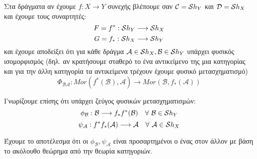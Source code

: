 \vspace*{0.3cm}
\noindent Στα δράγματα αν έχουμε $f:X\longrightarrow Y$ συνεχής βλέπουμε σαν $\mathcal{C} = \mathcal{S} h_Y$ και $\mathcal{D}=\mathcal{S} h_X$ και έχουμε τους συναρτητές:
$$F=f^* : \mathcal{S} h_Y \longrightarrow \mathcal{S} h_X$$
$$G=f_* : \mathcal{S} h_X \longrightarrow \mathcal{S} h_Y$$ και έχουμε αποδείξει ότι για κάθε δράγμα $\mathcal{A} \in \mathcal{S} h_X, \mathcal{B} \in \mathcal{S} h_Y$ υπάρχει φυσικός ισομορφισμός (δηλ. αν κρατήσουμε σταθερό το ένα αντικείμενο της μια κατηγορίας και για την άλλη κατηγορία τα αντικείμενα τρέχουν έχουμε φυσικό μετασχηματισμό)
$$\Phi_{\mathcal{B}\mathcal{A}} : Mor(f^*(\mathcal{B}), \mathcal{A}) \longrightarrow Mor(\mathcal{B},f_*(\mathcal{A}))$$

\begin{figure}[H]
    \centering
\end{figure}

\noindent Γνωρίζουμε επίσης ότι υπάρχει ζεύγος φυσικών μετασχηματισμών:
$$\phi_{\mathcal{B}} : \mathcal{B} \longrightarrow f_*f^*(\mathcal{B}) \quad \forall \ \mathcal{B} \in \mathcal{S} h_Y$$
$$\psi_{\mathcal A}: f^*f_*(\mathcal A) \longrightarrow \mathcal A \quad \forall \ \mathcal A \in \mathcal{S} h_X$$

\begin{figure}[H]
    \centering
\end{figure}

\noindent Έχουμε το αποτέλεσμα ότι οι $\phi_{\mathcal{B}}, \psi_{\mathcal{A}}$ είναι προσαρτημένοι ο ένας στον άλλον με βάση το ακόλουθο θεώρημα από την θεωρία κατηγοριών.

